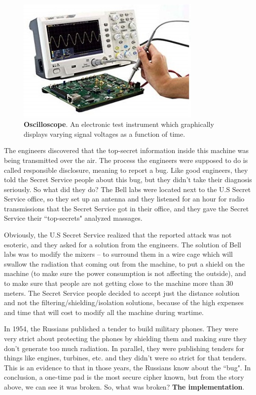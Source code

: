 \begin{figure}
    \centering
    \includegraphics[width=0.8\textwidth]{images/ch1_Intro/oscilloscope.jpg}
    \caption{\textbf{Oscilloscope}. An electronic test instrument which graphically displays varying signal voltages as a function of time.}
    \label{fig:Oscillo}
\end{figure}

The engineers discovered\cite{NSAsecret} that the top-secret information inside this machine was being transmitted over the air. The process the engineers were supposed to do is called responsible disclosure, meaning to report a bug. Like good engineers, they told the Secret Service people about this bug, but they didn't take their diagnosis seriously. So what did they do? The Bell labs were located next to the U.S Secret Service office, so they set up an antenna and they listened for an hour for radio transmissions that the Secret Service got in their office, and they gave the Secret Service their ``top-secrets" analyzed massages.

Obviously, the U.S Secret Service realized that the reported attack was not esoteric, and they asked for a solution from the engineers. The solution of Bell labs was to modify the mixers – to surround them in a wire cage which will swallow the radiation that coming out from the machine, to put a shield on the machine (to make sure the power consumption is not affecting the outside), and to make sure that people are not getting close to the machine more than 30 meters. The Secret Service people decided to accept just the distance solution and not the filtering/shielding/isolation solutions, because of the high expenses and time that will cost to modify all the machine during wartime.

In 1954, the Russians published a tender to build military phones. They were very strict about protecting the phones by shielding them and making sure they don't generate too much radiation. In parallel, they were publishing tenders for things like engines, turbines, etc. and they didn't were so strict for that tenders. This is an evidence to that in those years, the Russians know about the ``bug".
In conclusion, a one-time pad is the most secure cipher known, but from the story above, we can see it was broken. So, what was broken? \textbf{The implementation}.

